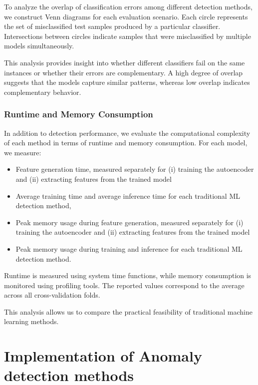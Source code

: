 To analyze the overlap of classification errors among different detection methods,
we construct Venn diagrams for each evaluation scenario. Each circle represents the set
of misclassified test samples produced by a particular classifier. Intersections between
circles indicate samples that were misclassified by multiple models simultaneously.

This analysis provides insight into whether different classifiers fail on the same
instances or whether their errors are complementary. A high degree of overlap suggests
that the models capture similar patterns, whereas low overlap indicates complementary
behavior.

\subsubsection{Runtime and Memory Consumption}

In addition to detection performance, we evaluate the computational complexity of
each method in terms of runtime and memory consumption. For each model, we measure:

\begin{itemize}
    \item Feature generation time, measured separately for (i) training the autoencoder and (ii) extracting features from the trained model
    \item Average training time and average inference time for each traditional \ac{ML} detection method,
    \item Peak memory usage during feature generation,  measured separately for (i) training the autoencoder and (ii) extracting features from the trained model
    \item Peak memory usage during training and inference for each traditional ML detection method.
\end{itemize}

Runtime is measured using system time functions, while memory consumption is monitored
using profiling tools. The reported values correspond to the average across all
cross-validation folds.

This analysis allows us to compare the practical feasibility of traditional machine
learning methods.

\section{Implementation of Anomaly detection methods}

